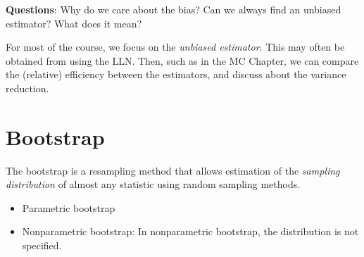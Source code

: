 \documentclass[
  letterpaper,
  DIV=11,
  numbers=noendperiod]{scrreprt}
\begin{document}
\textbf{Questions}: Why do we care about the bias? Can we always find an
unbiased estimator? What does it mean?

For most of the course, we focus on the \emph{unbiased estimator}. This
may often be obtained from using the LLN. Then, such as in the MC
Chapter, we can compare the (relative) efficiency between the
estimators, and discuss about the variance reduction.

\section{Bootstrap}\label{bootstrap}

The bootstrap is a resampling method that allows estimation of the
\emph{sampling distribution} of almost any statistic using random
sampling methods.

\begin{itemize}
\item
  Parametric bootstrap
\item
  Nonparametric bootstrap: In nonparametric bootstrap, the distribution
  is not specified.
\end{itemize}
\end{document}
